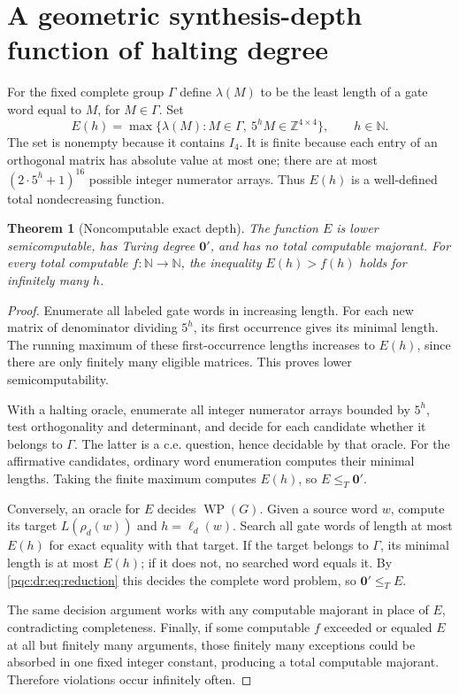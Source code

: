 \documentclass[11pt,letterpaper]{article}
\numberwithin{equation}{section}
\newtheorem{theorem}{Theorem}[section]
\theoremstyle{definition}
\theoremstyle{remark}
\newcommand{\N}{\mathbb N}
\newcommand{\Z}{\mathbb Z}
\newcommand{\srcmark}[1]{\par\noindent{\small\itshape [source~#1]}\par}
\newcommand{\WP}{\operatorname{WP}}
\begin{document}
\section{A geometric synthesis-depth function of halting degree}
\label{pqc:dr:sec:depth}
\srcmark{16}

For the fixed complete group $\Gamma$ define $\lambda(M)$ to be the
least length of a gate word equal to $M$, for $M\in\Gamma$. Set
\begin{equation}
 E(h)=\max\{\lambda(M):M\in\Gamma,\ 5^hM\in\Z^{4\times4}\},
 \qquad h\in\N.
 \label{pqc:dr:eq:E}
\end{equation}
The set is nonempty because it contains $I_4$. It is finite because
each entry of an orthogonal matrix has absolute value at most one;
there are at most $(2\cdot5^h+1)^{16}$ possible integer numerator arrays.
Thus $E(h)$ is a well-defined total nondecreasing function.

\begin{theorem}[Noncomputable exact depth]
\label{pqc:dr:thm:depth}
The function $E$ is lower semicomputable, has Turing degree
$\mathbf0'$, and has no total computable majorant. For every total
computable $f:\N\to\N$, the inequality $E(h)>f(h)$ holds for
infinitely many $h$.
\end{theorem}
\begin{proof}
Enumerate all labeled gate words in increasing length. For each new
matrix of denominator dividing $5^h$, its first occurrence gives its
minimal length. The running maximum of these first-occurrence lengths
increases to $E(h)$, since there are only finitely many eligible matrices.
This proves lower semicomputability.

With a halting oracle, enumerate all integer numerator arrays bounded
by $5^h$, test orthogonality and determinant, and decide for each candidate
whether it belongs to $\Gamma$. The latter is a c.e. question, hence
decidable by that oracle. For the affirmative candidates, ordinary word
enumeration computes their minimal lengths. Taking the finite maximum
computes $E(h)$, so $E\leq_T\mathbf0'$.

Conversely, an oracle for $E$ decides $\WP(G)$. Given a source word $w$,
compute its target $L(\rho_d(w))$ and $h=\ell_d(w)$. Search all gate
words of length at most $E(h)$ for exact equality with that target.
If the target belongs to $\Gamma$, its minimal length is at most $E(h)$;
if it does not, no searched word equals it. By \eqref{pqc:dr:eq:reduction}
this decides the complete word problem, so $\mathbf0'\leq_T E$.

The same decision argument works with any computable majorant in place
of $E$, contradicting completeness. Finally, if some computable $f$
exceeded or equaled $E$ at all but finitely many arguments, those finitely
many exceptions could be absorbed in one fixed integer constant, producing
a total computable majorant. Therefore violations occur infinitely often.
\end{proof}
\end{document}
